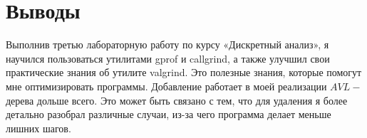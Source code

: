 \section{Выводы}
Выполнив третью лабораторную работу по курсу «Дискретный анализ», я научился пользоваться утилитами gprof и callgrind, а также улучшил свои практические знания об утилите valgrind. Это полезные знания, которые помогут мне оптимизировать программы. Добавление работает в моей реализации $AVL-$дерева дольше всего. Это может быть связано с тем, что для удаления я более детально разобрал различные случаи, из-за чего программа делает меньше лишних шагов.
\pagebreak
